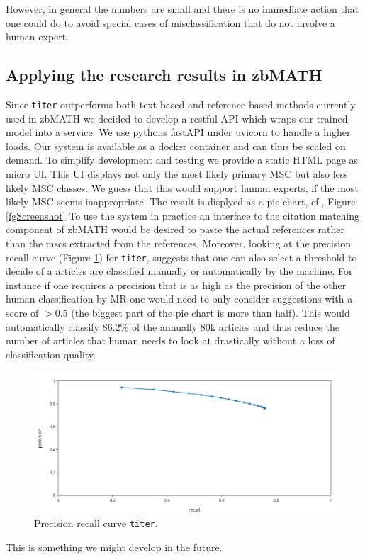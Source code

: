 However, in general the numbers are small and there is no immediate action that one could do to avoid special cases of misclassification that do not involve a human expert.

\subsection{Applying the research results in zbMATH}
Since \texttt{titer} outperforms both text-based and reference based methods currently used in zbMATH we decided to develop a restful API which wraps our trained model into a service.
We use pythons fastAPI under uvicorn to handle a higher loads.
Our system is available as a docker container and can thus be scaled on demand.
To simplify development and testing we provide a static HTML page as micro UI.
This UI displays not only the most likely primary MSC but also less likely MSC classes.
We guess that this would support human experts, if the most likely MSC seems inappropriate.
The result is displyed as a pie-chart, cf., Figure \ref{fgScreenshot}
To use the system in practice an interface to the citation matching component of zbMATH would be desired to paste the actual references rather than the mscs extracted from the references.
Moreover, looking at the precision recall curve (Figure \ref{fgPR}) for \texttt{titer}, suggests that one can also select a threshold to decide of a articles are classified manually or automatically by the machine.
For instance if one requires a precision that is as high as the precision of the other human classification by MR one would need to only consider suggestions with a score of $>0.5$ (the biggest part of the pie chart is more than half). This would automatically classify $86.2\%$ of the annually 80k articles and thus reduce the number of articles that human needs to look at drastically without a loss of classification quality.

\begin{figure}[h]
  \centering
  \includegraphics[width=1.1\textwidth]{prcurve.png}
  \caption{Precision recall curve \texttt{titer}.}\label{fgPR}
\end{figure}
This is something we might develop in the future.
  


